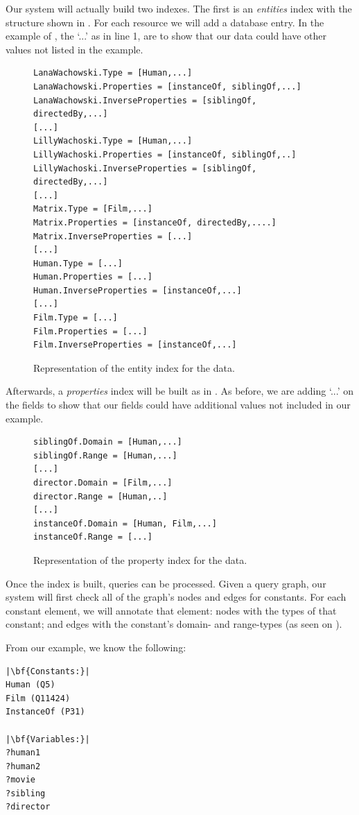 Our system will actually build two indexes. The first is an \textit{entities} index with the structure shown in . For each resource we will add a database entry. In the example of , the `...' as in line 1, are to show that our data could have other values not listed in the example. 
\begin{figure}[H]
\begin{verbatim}
LanaWachowski.Type = [Human,...]
LanaWachowski.Properties = [instanceOf, siblingOf,...]
LanaWachowski.InverseProperties = [siblingOf, directedBy,...]
[...]
LillyWachoski.Type = [Human,...]
LillyWachoski.Properties = [instanceOf, siblingOf,..]
LillyWachoski.InverseProperties = [siblingOf, directedBy,...]
[...]
Matrix.Type = [Film,...]
Matrix.Properties = [instanceOf, directedBy,....]
Matrix.InverseProperties = [...]
[...]
Human.Type = [...]
Human.Properties = [...]
Human.InverseProperties = [instanceOf,...]
[...]
Film.Type = [...]
Film.Properties = [...]
Film.InverseProperties = [instanceOf,...]
\end{verbatim}
\caption{Representation of the entity index for the  data.}
\label{fig:siblingsEntityIndex}
\end{figure}

Afterwards, a \textit{properties} index will be built as in . As before, we are adding `...' on the fields to show that our fields could have additional values not included in our example.
\begin{figure}[H]
\begin{verbatim}
siblingOf.Domain = [Human,...]
siblingOf.Range = [Human,...]
[...]
director.Domain = [Film,...]
director.Range = [Human,..]
[...]
instanceOf.Domain = [Human, Film,...]
instanceOf.Range = [...]
\end{verbatim}
\caption{Representation of the property index for the  data.}
\label{fig:siblingsPropertyIndex}
\end{figure}

Once the index is built, queries can be processed. Given a query graph, our system will first check all of the graph's nodes and edges for constants. For each constant element, we will annotate that element: nodes with the types of that constant; and edges with the constant's domain- and range-types (as seen on ). 

From our example, we know the following:

\begin{verbatim}
|\bf{Constants:}|
Human (Q5)
Film (Q11424)
InstanceOf (P31)

|\bf{Variables:}|
?human1
?human2
?movie
?sibling
?director
\end{verbatim}

